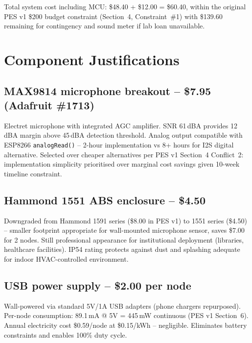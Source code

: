 \documentclass[11pt, letterpaper]{article}
\begin{document}
\vspace{6pt}
\noindent Total system cost including MCU: \$48.40 + \$12.00 = \$60.40,
within the original PES v1 \$200 budget constraint (Section~4, Constraint~\#1)
with \$139.60 remaining for contingency and sound meter if lab loan unavailable.

\section{Component Justifications}

\subsection{MAX9814 microphone breakout -- \$7.95 (Adafruit \#1713)}
Electret microphone with integrated AGC amplifier. SNR 61\,dBA provides
12\,dBA margin above 45\,dBA detection threshold. Analog output compatible
with ESP8266 \texttt{analogRead()} -- 2-hour implementation vs 8+ hours for
I2S digital alternative. Selected over cheaper alternatives per PES v1
Section~4 Conflict~2: implementation simplicity prioritised over marginal
cost savings given 10-week timeline constraint.

\subsection{Hammond 1551 ABS enclosure -- \$4.50}
Downgraded from Hammond 1591 series (\$8.00 in PES v1) to 1551 series
(\$4.50) -- smaller footprint appropriate for wall-mounted microphone sensor,
saves \$7.00 for 2 nodes. Still professional appearance for institutional
deployment (libraries, healthcare facilities). IP54 rating protects against
dust and splashing adequate for indoor HVAC-controlled environment.

\subsection{USB power supply -- \$2.00 per node}
Wall-powered via standard 5V/1A USB adapters (phone chargers repurposed).
Per-node consumption: 89.1\,mA @ 5V = 445\,mW continuous (PES v1 Section~6).
Annual electricity cost \$0.59/node at \$0.15/kWh -- negligible.
Eliminates battery constraints and enables 100\% duty cycle.
\end{document}
